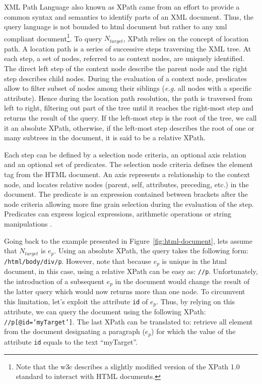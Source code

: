 XML Path Language also known as XPath came from an effort to provide a common syntax and semantics to identify parts of an XML document\cite{W3C2016}. Thus, the query language is not bounded to \gls{html} document but rather to any \gls{xml} compliant document\footnote{Note that the \gls{w3c} describes a slightly modified version of the XPath 1.0 standard to interact with HTML documents.}. To query $N_{target}$, XPath relies on the concept of location path. A location path\cite{Gottlob2002} is a series of successive steps traversing the XML tree. At each step, a set of nodes, referred to as context nodes, are uniquely identified. The direct left step of the context node describe the parent node and the right step describes child nodes. During the evaluation of a context node, predicates allow to filter subset of nodes among their siblings (\emph{e.g.} all nodes with a specific attribute). Hence during the location path resolution, the path is traversed from left to right, filtering out part of the tree until it reaches the right-most step and returns the result of the query. If the left-most step is the root of the tree, we call it an absolute XPath, otherwise, if the left-most step describes the root of one or many subtrees in the document, it is said to be a relative XPath. 

Each step can be defined by a selection node criteria, an optional axis relation and an optional set of predicates\cite{Barton2003}. The selection node criteria defines the element tag from the HTML document. An axis represents a relationship to the context node, and locates relative nodes (parent, self, attributes, preceding, etc.) in the document. The predicate is an expression contained between brackets after the node criteria allowing more fine grain selection during the evaluation of the step. Predicates can express logical expressions, arithmetic operations or string manipulations \cite{Gottlob2005}.

Going back to the example presented in Figure~\ref{fig:html-document}, lets assume that $N_{target}$ is $e_{p}$. Using an absolute XPath, the query takes the following form: \texttt{/html/body/div/p}. However, note that because $e_p$ is unique in the \gls{html} document, in this case, using a relative XPath can be easy as: \texttt{//p}. Unfortunately, the introduction of a subsequent $e_p$ in the document would change the result of the latter query which would now returns more than one node. To circumvent this limitation, let's exploit the  attribute \texttt{id} of $e_p$. Thus, by relying on this attribute, we can query the document using the following XPath: \texttt{//p[@id='myTarget']}. The last XPath can be translated to: retrieve all element from the document designating a paragraph ($e_p$) for which the value of the attribute \texttt{id} equals to the text ``myTarget''.

